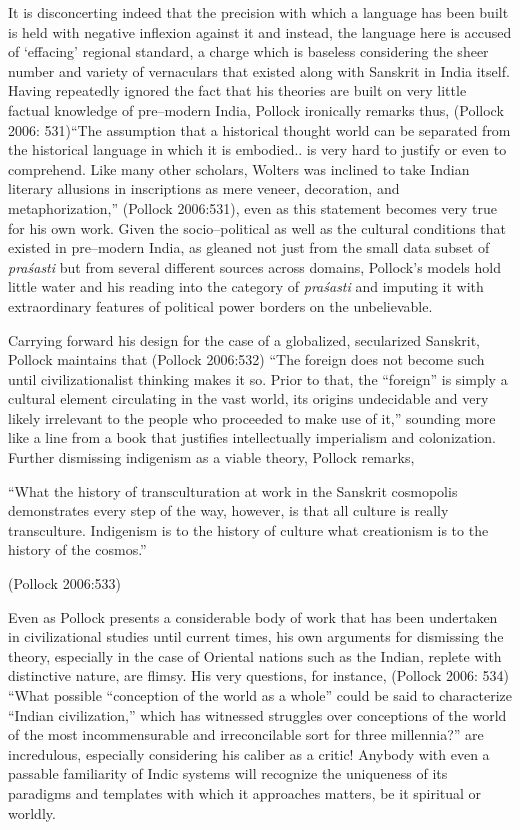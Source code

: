 It is disconcerting indeed that the precision with which a language has been built is held with negative inflexion against it and instead, the language here is accused of ‘effacing’ regional standard, a charge which is baseless considering the sheer number and variety of vernaculars that existed along with Sanskrit in India itself. Having repeatedly ignored the fact that his theories are built on very little factual knowledge of pre–modern India, Pollock ironically remarks thus, (Pollock 2006: 531)“The assumption that a historical thought world can be separated from the historical language in which it is embodied.. is very hard to justify or even to comprehend. Like many other scholars, Wolters was inclined to take Indian literary allusions in inscriptions as mere veneer, decoration, and metaphorization,” (Pollock 2006:531), even as this statement becomes very true for his own work. Given the socio–political as well as the cultural conditions that existed in pre–modern India, as gleaned not just from the small data subset of \textit{praśasti} but from several different sources across domains, Pollock’s models hold little water and his reading into the category of \textit{praśasti} and imputing it with extraordinary features of political power borders on the unbelievable.

Carrying forward his design for the case of a globalized, secularized Sanskrit, Pollock maintains that (Pollock 2006:532) “The foreign does not become such until civilizationalist thinking makes it so. Prior to that, the “foreign” is simply a cultural element circulating in the vast world, its origins undecidable and very likely irrelevant to the people who proceeded to make use of it,” sounding more like a line from a book that justifies intellectually imperialism and colonization. Further dismissing indigenism as a viable theory, Pollock remarks,

\begin{myquote}
“What the history of transculturation at work in the Sanskrit cosmopolis demonstrates every step of the way, however, is that all culture is really transculture. Indigenism is to the history of culture what creationism is to the history of the cosmos.”
\end{myquote}

\hfill (Pollock 2006:533)

Even as Pollock presents a considerable body of work that has been undertaken in civilizational studies until current times, his own arguments for dismissing the theory, especially in the case of Oriental nations such as the Indian, replete with distinctive nature, are flimsy. His very questions, for instance, (Pollock 2006: 534) “What possible “conception of the world as a whole” could be said to characterize “Indian civilization,” which has witnessed struggles over conceptions of the world of the most incommensurable and irreconcilable sort for three millennia?” are incredulous, especially considering his caliber as a critic! Anybody with even a passable familiarity of Indic systems will recognize the uniqueness of its paradigms and templates with which it approaches matters, be it spiritual or worldly.

